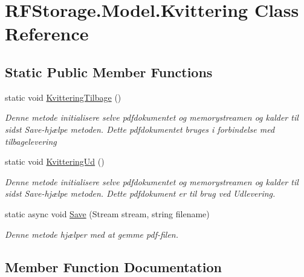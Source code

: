 \hypertarget{class_r_f_storage_1_1_model_1_1_kvittering}{}\section{R\+F\+Storage.\+Model.\+Kvittering Class Reference}
\label{class_r_f_storage_1_1_model_1_1_kvittering}
\subsection*{Static Public Member Functions}
\begin{DoxyCompactItemize}
\item 
static void \mbox{\hyperlink{class_r_f_storage_1_1_model_1_1_kvittering_a6a7506b6a7e016913e26e7e23e9cd381}{Kvittering\+Tilbage}} ()
\begin{DoxyCompactList}\small\item\em Denne metode initialisere selve pdfdokumentet og memorystreamen og kalder til sidst Save-\/hjælpe metoden. Dette pdfdokumentet bruges i forbindelse med tilbagelevering \end{DoxyCompactList}\item 
static void \mbox{\hyperlink{class_r_f_storage_1_1_model_1_1_kvittering_acca12604adfc5e6138058525889eae03}{Kvittering\+Ud}} ()
\begin{DoxyCompactList}\small\item\em Denne metode initialisere selve pdfdokumentet og memorystreamen og kalder til sidst Save-\/hjælpe metoden. Dette pdfdokument er til brug ved Udlevering. \end{DoxyCompactList}\item 
static async void \mbox{\hyperlink{class_r_f_storage_1_1_model_1_1_kvittering_abf9118e928ad6a4cc9e771b0875353ab}{Save}} (Stream stream, string filename)
\begin{DoxyCompactList}\small\item\em Denne metode hjælper med at gemme pdf-\/filen. \end{DoxyCompactList}\end{DoxyCompactItemize}


\subsection{Member Function Documentation}
\mbox{\label{class_r_f_storage_1_1_model_1_1_kvittering_a6a7506b6a7e016913e26e7e23e9cd381}} 
